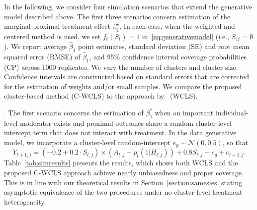 \documentclass[12pt]{article}
\newcommand{\zw}[1]{\textcolor{blue}{[\textit{ZW: #1}]}}
\newcommand{\hs}[3]{\textcolor{red}{[\textit{HS: #1}]}}
\begin{document}
In the following, we consider four simulation scenarios that extend the generative model described above. The first three scenarios concern estimation of the marginal proximal treatment effect $\beta_1^\star$. In each case, when the weighted and centered method is used, we set $f_t(S_t)=1$ in~\eqref{eq:generativemodel} (i.e., $S_{1t} = \emptyset$). We report average $\hat{\beta}_1$ point estimates, standard deviation (SE) and root mean squared error (RMSE) of $\hat{\beta}_1$, and 95\% confidence interval coverage probabilities (CP) across 1000 replicates. We vary the number of clusters and cluster size.  Confidence intervals are constructed based on standard errors that are corrected for the estimation of weights and/or small samples.  We compare the proposed cluster-based method (C-WCLS) to the approach by~\cite{Boruvkaetal} (WCLS).


. The first scenario concerns the estimation of $\beta_1^*$ when an important individual-level moderator exists and proximal outcomes share a random cluster-level intercept term that does not interact with treatment. In the data generative model, we incorporate a cluster-level random-intercept $e_g \sim \mathcal{N}(0,0.5)$, so that
\begin{equation*}
Y_{t+1,j} = (-0.2 + 0.2 \cdot S_{t,j}) \times (A_{t,j} -p_t(1|H_{t,j})) + 0.8 S_{t,j} + e_g +e_{t+1,j}.
\end{equation*}
Table~\ref{tab:simresults} presents the results, which shows both WCLS and the proposed C-WCLS approach achieve nearly unbiasedness and proper coverage. This is in line with our theoretical results in    Section~\ref{section:samesies} stating asymptotic equivalence of the two procedures under no cluster-level treatment heterogeneity.
\end{document}
